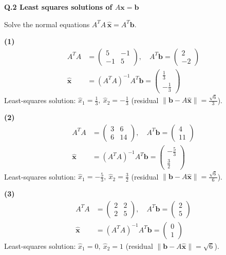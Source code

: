 \medskip\noindent\textbf{Q.2  Least squares solutions of $A\mathbf x=\mathbf b$}\par\smallskip
Solve the normal equations $A^TA\,\hat{\mathbf x}=A^T\mathbf b$.

\noindent\textbf{(1)}
\begin{align*}
A^TA&=\begin{pmatrix}5 & -1 \\ -1 & 5\end{pmatrix},\quad A^T\mathbf b=\begin{pmatrix}2 \\ -2\end{pmatrix} \\
\hat{\mathbf x}&=(A^TA)^{-1}A^T\mathbf b=\begin{pmatrix}\frac{1}{3} \\ - \frac{1}{3}\end{pmatrix}
\end{align*}
Least-squares solution: $\hat x_1=\frac{1}{3},\ \hat x_2=- \frac{1}{3}$ (residual $\|\mathbf b-A\hat{\mathbf x}\|=\frac{\sqrt{6}}{3}$).


\noindent\textbf{(2)}
\begin{align*}
A^TA&=\begin{pmatrix}3 & 6 \\ 6 & 14\end{pmatrix},\quad A^T\mathbf b=\begin{pmatrix}4 \\ 11\end{pmatrix} \\
\hat{\mathbf x}&=(A^TA)^{-1}A^T\mathbf b=\begin{pmatrix}- \frac{5}{3} \\ \frac{3}{2}\end{pmatrix}
\end{align*}
Least-squares solution: $\hat x_1=- \frac{5}{3},\ \hat x_2=\frac{3}{2}$ (residual $\|\mathbf b-A\hat{\mathbf x}\|=\frac{\sqrt{6}}{6}$).


\noindent\textbf{(3)}
\begin{align*}
A^TA&=\begin{pmatrix}2 & 2 \\ 2 & 5\end{pmatrix},\quad A^T\mathbf b=\begin{pmatrix}2 \\ 5\end{pmatrix} \\
\hat{\mathbf x}&=(A^TA)^{-1}A^T\mathbf b=\begin{pmatrix}0 \\ 1\end{pmatrix}
\end{align*}
Least-squares solution: $\hat x_1=0,\ \hat x_2=1$ (residual $\|\mathbf b-A\hat{\mathbf x}\|=\sqrt{6}$).


